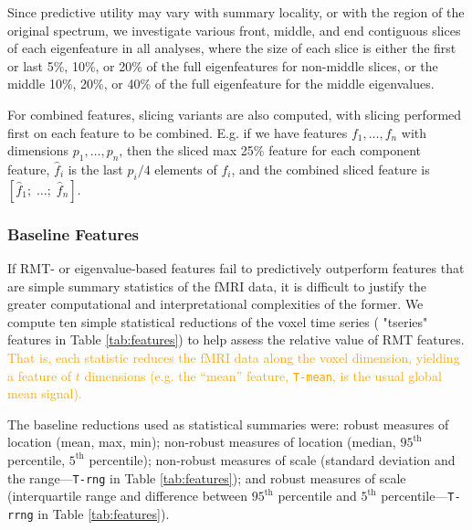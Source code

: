 \documentclass[12pt]{spieman}  %
\newcommand{\code}[1]{\small\texttt{#1}\normalsize}
\begin{document}
\begin{spacing}{2}
Since predictive utility may vary with summary locality, or with the region of
the original spectrum, we investigate various front, middle, and end contiguous
slices of each eigenfeature in all analyses, where the size of each slice is
either the first or last 5\%, 10\%, or 20\% of the full eigenfeatures for
non-middle slices, or the middle 10\%, 20\%, or 40\% of the full eigenfeature for
the middle eigenvalues.

For combined features, slicing variants are also computed, with slicing
performed first on each feature to be combined. E.g. if we have features \(f_1,
\dots,  f_n\) with dimensions \(p_1, \dots, p_n\), then the sliced max 25\%
feature for each component feature, \(\hat{f}_i\) is the last \(p_i / 4\)
elements of \(f_i\), and the combined sliced feature is  \([\hat{f}_1;\;
\dots;\; \hat{f}_n]\).


\subsubsection{Baseline Features}
\label{sec:baselines}

If RMT- or eigenvalue-based features fail to predictively outperform features
that are simple summary statistics of the fMRI data, it is difficult to justify
the greater computational and interpretational complexities of the former. We
compute ten simple statistical reductions of the voxel time series ( "tseries"
features in Table \ref{tab:features}) to help assess the relative value of RMT
features.  \textcolor{orange}{That is, each statistic reduces the fMRI data along
the voxel dimension, yielding a feature of \(t\) dimensions (e.g. the ``mean''
feature, \code{T-mean}, is the usual global mean signal).}

The baseline reductions used as statistical summaries were: robust measures of
location (mean, max, min); non-robust measures of location (median,
\(95^{\text{th}}\) percentile, \(5^{\text{th}}\) percentile); non-robust
measures of scale (standard deviation and the range—\code{T-rng} in Table
\ref{tab:features}); and robust measures of scale (interquartile range and
difference between \(95^{\text{th}}\) percentile and \(5^{\text{th}}\)
percentile—\code{T-rrng} in Table \ref{tab:features}).



\end{spacing}
\end{document}
